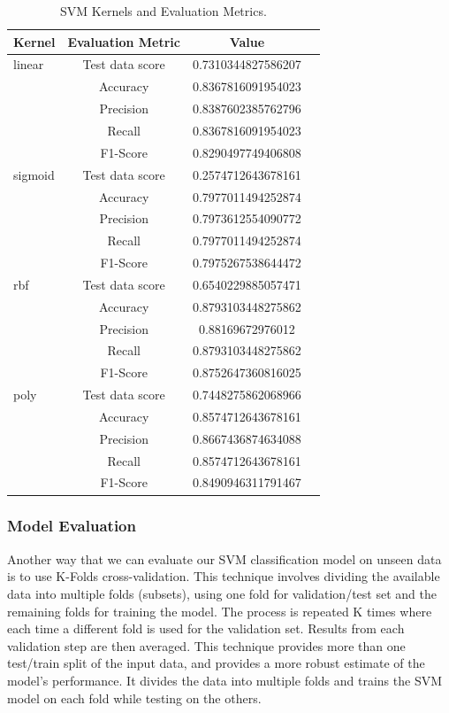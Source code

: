 \documentclass[11pt]{article}
\begin{document}
\begin{table}[hbt!]
   \large
   \centering
   \begin{tabular}{lccr}
   \hline
   \textbf{Kernel} & \textbf{Evaluation Metric} & \textbf{Value} \\ 
   \hline
   linear & Test data score & 0.7310344827586207  \\
          & Accuracy & 0.8367816091954023  \\
          & Precision & 0.8387602385762796 \\
          & Recall & 0.8367816091954023  \\
          & F1-Score & 0.8290497749406808  \\
   \hline
   sigmoid & Test data score & 0.2574712643678161  \\
          & Accuracy & 0.7977011494252874  \\
          & Precision & 0.7973612554090772 \\
          & Recall & 0.7977011494252874  \\
          & F1-Score & 0.7975267538644472  \\
   \hline   
   rbf & Test data score & 0.6540229885057471  \\
          & Accuracy & 0.8793103448275862  \\
          & Precision & 0.88169672976012 \\
          & Recall & 0.8793103448275862  \\
          & F1-Score & 0.8752647360816025  \\
   \hline   
   poly & Test data score & 0.7448275862068966  \\
          & Accuracy & 0.8574712643678161  \\
          & Precision & 0.8667436874634088 \\
          & Recall & 0.8574712643678161  \\
          & F1-Score & 0.8490946311791467  \\
   \hline
   \end{tabular}
   \caption{SVM Kernels and Evaluation Metrics.} 
\end{table}

\subsubsection{Model Evaluation}
Another way that we can evaluate our SVM classification model on unseen data is to use K-Folds cross-validation. This technique involves dividing the available data into multiple folds (subsets), using one fold for validation/test set and the remaining folds for training the model. The process is repeated K times where each time a different fold is used for the validation set. Results from each validation step are then averaged. This technique provides more than one test/train split of the input data, and provides a more robust estimate of the model’s performance. It divides the data into multiple folds and trains the SVM model on each fold while testing on the others. \cite{geekforgeeks2023}
\end{document}
